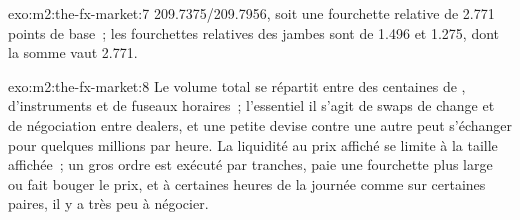 \begin{solution}{exo:m2:the-fx-market:7}
209.7375/209.7956, soit une fourchette relative de 2.771 points de base~; les fourchettes relatives des
jambes sont de 1.496 et 1.275, dont la somme vaut 2.771.
\end{solution}

\begin{solution}{exo:m2:the-fx-market:8}
Le volume total se répartit entre des centaines de , d'instruments et de fuseaux horaires~; l'essentiel
il s'agit de swaps de change et de négociation entre dealers, et une petite devise contre une autre
peut s'échanger pour quelques millions par heure. La liquidité au prix affiché se limite à la
taille affichée~; un gros ordre est exécuté par tranches, paie une fourchette plus large ou fait bouger le prix,
et à certaines heures de la journée comme sur certaines paires, il y a très peu à négocier.
\end{solution}

